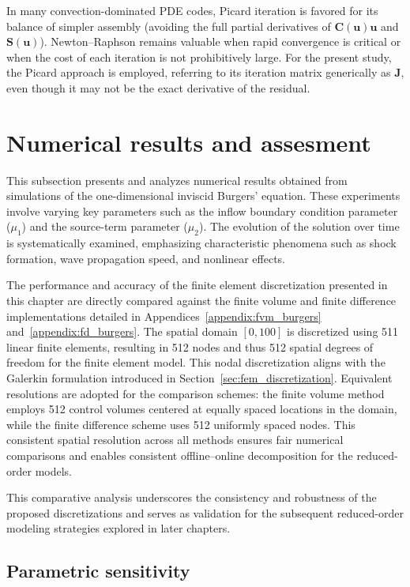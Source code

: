 In many convection-dominated PDE codes, Picard iteration is favored for its balance of simpler assembly (avoiding the full partial derivatives of \(\mathbf{C}(\mathbf{u})\mathbf{u}\) and \(\mathbf{S}(\mathbf{u})\)). Newton--Raphson remains valuable when rapid convergence is critical or when the cost of each iteration is not prohibitively large. For the present study, the Picard approach is employed, referring to its iteration matrix generically as \(\mathbf{J}\), even though it may not be the exact derivative of the residual.

\section{Numerical results and assesment}

This subsection presents and analyzes numerical results obtained from simulations of the one-dimensional inviscid Burgers' equation. These experiments involve varying key parameters such as the inflow boundary condition parameter (\(\mu_1\)) and the source-term parameter (\(\mu_2\)). The evolution of the solution over time is systematically examined, emphasizing characteristic phenomena such as shock formation, wave propagation speed, and nonlinear effects.

The performance and accuracy of the finite element discretization presented in this chapter are directly compared against the finite volume and finite difference implementations detailed in Appendices~\ref{appendix:fvm_burgers} and~\ref{appendix:fd_burgers}. The spatial domain \([0, 100]\) is discretized using 511 linear finite elements, resulting in 512 nodes and thus 512 spatial degrees of freedom for the finite element model. This nodal discretization aligns with the Galerkin formulation introduced in Section~\ref{sec:fem_discretization}. Equivalent resolutions are adopted for the comparison schemes: the finite volume method employs 512 control volumes centered at equally spaced locations in the domain, while the finite difference scheme uses 512 uniformly spaced nodes. This consistent spatial resolution across all methods ensures fair numerical comparisons and enables consistent offline–online decomposition for the reduced-order models.

This comparative analysis underscores the consistency and robustness of the proposed discretizations and serves as validation for the subsequent reduced-order modeling strategies explored in later chapters. 

\subsection{Parametric sensitivity}

